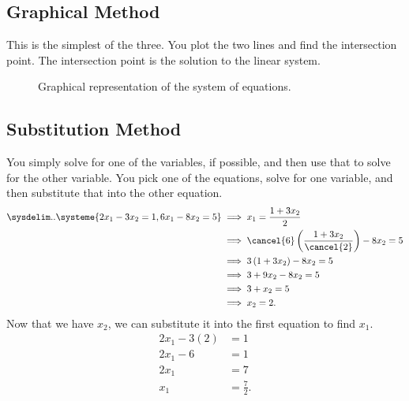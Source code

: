 \subsection{Graphical Method}
\label{sub_sec:graphical_method}

This is the simplest of the three. You plot the two lines and find the
intersection point. The intersection point is the solution to the linear system.

\begin{figure}[H]
  \centering


  \caption{Graphical representation of the system of equations.}
  \label{fig:graphical_representation_of_the_system_of_equations}
\end{figure}


\subsection{Substitution Method}
\label{sub_sec:substitution_method}

You simply solve for one of the variables, if possible, and then use that to
solve for the other variable. You pick one of the equations, solve for one
variable, and then substitute that into the other equation.
\begin{align*}
  \sysdelim..\systeme{
    2x_1 - 3x_2 = 1,
    6x_1 - 8x_2 = 5
  } &\implies x_1 = \frac{1 + 3x_2}{2} \\
    &\implies \cancel{6}\left(\frac{1 + 3x_2}{\cancel{2}}\right) - 8x_2 = 5 \\
    &\implies 3\left(1 + 3x_2\right) - 8x_2 = 5 \\
    &\implies 3 + 9x_2 - 8x_2 = 5 \\
    &\implies 3 + x_2 = 5 \\
    &\implies x_2 = 2
.\end{align*}
Now that we have $x_2$, we can substitute it into the first equation to find
$x_1$.
\begin{align*}
  2x_1 - 3(2) &= 1 \\
  2x_1 - 6 &= 1 \\
  2x_1 &= 7 \\
  x_1 &= \frac{7}{2}
.\end{align*}

